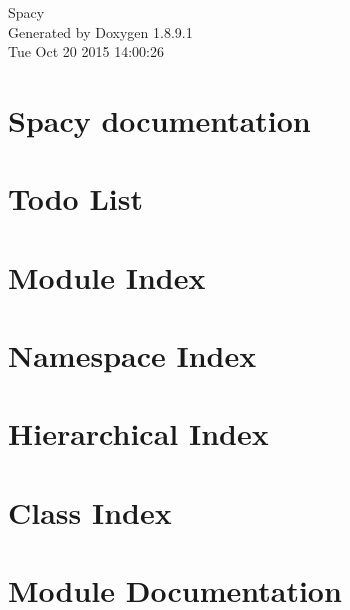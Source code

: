\documentclass[twoside]{book}
\newcommand{\+}{\discretionary{\mbox{\scriptsize$\hookleftarrow$}}{}{}}
\newcommand{\clearemptydoublepage}{%
  \newpage{\pagestyle{empty}\cleardoublepage}%
}
\begin{document}
\hypersetup{pageanchor=false,
             bookmarks=true,
             bookmarksnumbered=true,
             pdfencoding=unicode
            }
\begin{titlepage}
\vspace*{7cm}
\begin{center}%
{\Large Spacy }\\
\vspace*{1cm}
{\large Generated by Doxygen 1.8.9.1}\\
\vspace*{0.5cm}
{\small Tue Oct 20 2015 14:00:26}\\
\end{center}
\end{titlepage}
\clearemptydoublepage
\tableofcontents
\clearemptydoublepage
{}
\hypersetup{pageanchor=true}

\chapter{Spacy documentation}
\label{index}\hypertarget{index}{}
\chapter{Todo List}
\label{todo}
\hypertarget{todo}{}

\chapter{Module Index}

\chapter{Namespace Index}

\chapter{Hierarchical Index}

\chapter{Class Index}

\chapter{Module Documentation}















\end{document}
